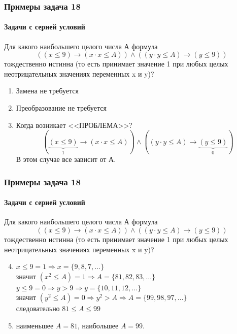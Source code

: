 \begin{frame}[t]
\frametitle{Примеры задача 18}
\framesubtitle{Задачи с серией условий}

Для какого наибольшего целого числа А формула
$$( (x \leq 9) \rightarrow (x\cdot x \leq A) ) \wedge ( (y\cdot y \leq A) \rightarrow (y \leq 9) )$$
тождественно истинна (то есть принимает значение 1 при любых целых неотрицательных значениях переменных x и y)?
	\begin{enumerate}
		\item Замена не требуется 	\pause 
		\item Преобразование не требуется 	\pause 
		\item Когда возникает <<ПРОБЛЕМА>>?  	\pause 
		$$( \underbrace{(x \leq 9)}_{1} \rightarrow (x\cdot x \leq A) ) \wedge ( (y\cdot y \leq A) \rightarrow \underbrace{(y \leq 9)}_{0} )$$ В этом случае все зависит от А.
		
		
	\end{enumerate}
	
	
	
\end{frame}

\begin{frame}[t]
\frametitle{Примеры задача 18}
\framesubtitle{Задачи с серией условий}

Для какого наибольшего целого числа А формула
$$( (x \leq 9) \rightarrow (x\cdot x \leq A) ) \wedge ( (y\cdot y \leq A) \rightarrow (y \leq 9) )$$
тождественно истинна (то есть принимает значение 1 при любых целых неотрицательных значениях переменных x и y)?
	\begin{enumerate}
		\setcounter{enumi}{3}
		\item $x \leq 9=1 \Rightarrow x=\{9,8,7, \ldots\}$\\ 	\pause 
		      значит $(x^2 \leq A)=1 \Rightarrow A=\{81,82,83, \ldots\}$\\ 	\pause 
		      $y \leq 9=0 \Rightarrow y>9 \Rightarrow y=\{10,11,12,\ldots\}$\\  	\pause 
					значит $(y^2 \leq A)=0 \Rightarrow y^2>A \Rightarrow A=\{99,98,97, \ldots\}$\\ 	\pause 
					следовательно $81\leq A \leq 99$ 	\pause 
	 \item наименьшее $A=81$, наибольшее $A=99$.
		
	\end{enumerate}
	
	
	
\end{frame}

